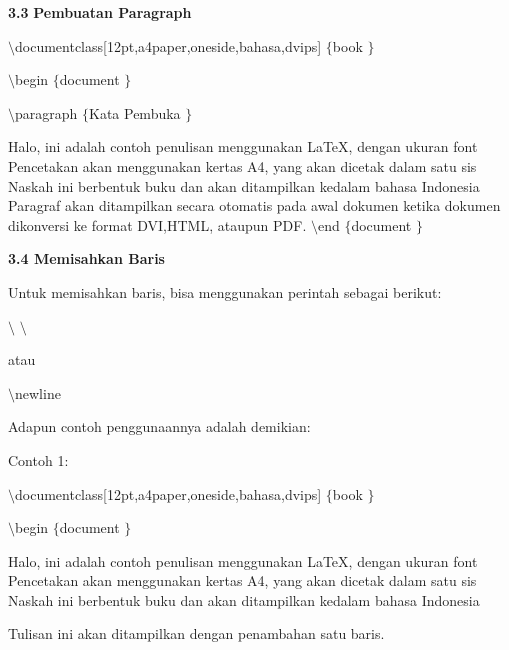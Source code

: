 \begin{itemize}
\vspace{12pt}
\textbf{3.3 }\textbf{Pembuatan Paragraph} \par
{\fontsize{10pt}{10pt}\selectfont  $  \setminus  $documentclass[12pt,a4paper,oneside,bahasa,dvips] $  \{  $book $  \}  $} \par
{\fontsize{10pt}{10pt}\selectfont  $  \setminus  $begin $  \{  $document $  \}  $} \par
{\fontsize{10pt}{10pt}\selectfont  $  \setminus  $paragraph $  \{  $Kata Pembuka $  \}  $} \par
\vspace{9pt}
{\fontsize{10pt}{10pt}\selectfont Halo, ini adalah contoh penulisan menggunakan LaTeX, dengan ukuran font Pencetakan akan menggunakan kertas A4, yang akan dicetak dalam satu sis Naskah ini berbentuk buku dan akan ditampilkan kedalam bahasa Indonesia Paragraf akan ditampilkan secara otomatis pada awal dokumen ketika dokumen dikonversi ke format DVI,HTML, ataupun PDF.  $  \setminus  $end $  \{  $document $  \}  $} \par
\vspace{12pt}
\vspace{12pt}
\textbf{3.4 Memisahkan Baris} \par
Untuk memisahkan baris, bisa menggunakan perintah sebagai berikut: \par
 $  \setminus  $ $  \setminus  $ \par
atau \par
{\fontsize{10pt}{10pt}\selectfont  $  \setminus  $newline} \par
\vspace{12pt}
Adapun contoh penggunaannya adalah demikian: \par
Contoh 1: \par
{\fontsize{10pt}{10pt}\selectfont  $  \setminus  $documentclass[12pt,a4paper,oneside,bahasa,dvips] $  \{  $book $  \}  $} \par
{\fontsize{10pt}{10pt}\selectfont  $  \setminus  $begin $  \{  $document $  \}  $} \par
\vspace{10pt}
{\fontsize{10pt}{10pt}\selectfont Halo, ini adalah contoh penulisan menggunakan LaTeX, dengan ukuran font Pencetakan akan menggunakan kertas A4, yang akan dicetak dalam satu sis Naskah ini berbentuk buku dan akan ditampilkan kedalam bahasa Indonesia} \par
\vspace{10pt}
{\fontsize{10pt}{10pt}\selectfont Tulisan ini akan ditampilkan dengan penambahan satu baris.} \par

\end{itemize}
